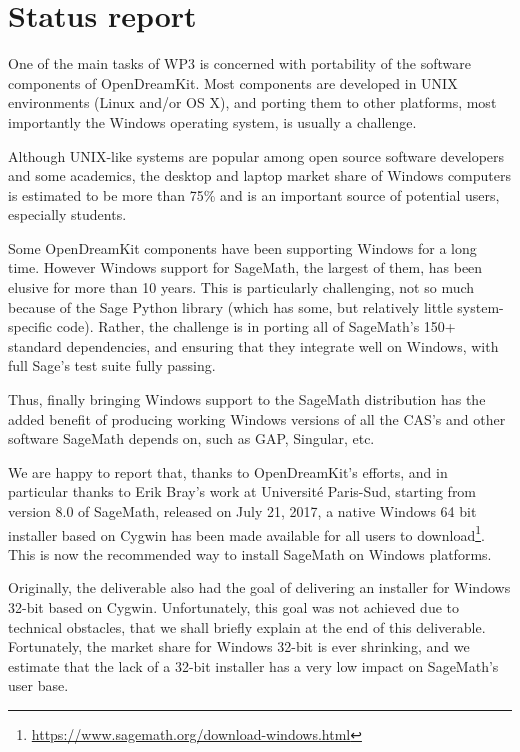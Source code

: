 \hypertarget{status-report}{%
\section{Status report}\label{status-report}}

One of the main tasks of WP3 is concerned with portability of the
software components of OpenDreamKit. Most components are developed in
UNIX environments (Linux and/or OS X), and porting them to other
platforms, most importantly the Windows operating system, is usually a
challenge.

Although UNIX-like systems are popular among open source software
developers and some academics, the desktop and laptop market share of
Windows computers is estimated to be more than 75\% and is an important
source of potential users, especially students.

Some OpenDreamKit components have been supporting Windows for a long
time. However Windows support for SageMath, the largest of them, has
been elusive for more than 10 years. This is particularly challenging,
not so much because of the Sage Python library (which has some, but
relatively little system-specific code). Rather, the challenge is in
porting all of SageMath's 150+ standard dependencies, and ensuring that
they integrate well on Windows, with full Sage's test suite fully passing.

Thus, finally bringing Windows support to the SageMath distribution has
the added benefit of producing working Windows versions of all the CAS's
and other software SageMath depends on, such as GAP, Singular, etc.

We are happy to report that, thanks to OpenDreamKit's efforts, and in
particular thanks to Erik Bray's work at Université Paris-Sud, starting from
version 8.0 of SageMath, released on July 21, 2017, a native Windows 64 bit
installer based on Cygwin has been made available for all users to
download\footnote{\url{https://www.sagemath.org/download-windows.html}}.
This is now the recommended way to install SageMath on Windows
platforms.

Originally, the deliverable also had the goal of delivering an installer
for Windows 32-bit based on Cygwin. Unfortunately, this goal was not
achieved due to technical obstacles, that we shall briefly explain at
the end of this deliverable. Fortunately, the market share for Windows
32-bit is ever shrinking, and we estimate that the lack of a 32-bit
installer has a very low impact on SageMath's user base.


